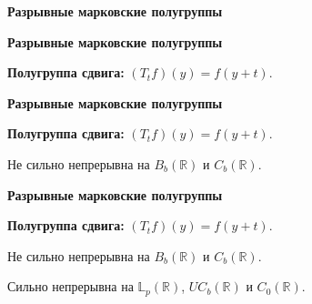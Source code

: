 \documentclass[11pt]{article}
\newcommand{\R}{\mathbb{R}}
\newcommand{\Lp}{\mathbb{L}}
\begin{document}
\newpage

\begin{center}
{\color{notaeYELLOW}\bfseries\fontsize{44}{52}\selectfont Разрывные марковские полугруппы}
\end{center}
\vspace*{\fill}
\begin{center}
\fontsize{36}{43}\selectfont
\end{center}
\vspace*{\fill}

\newpage

\begin{center}
{\color{notaeYELLOW}\bfseries\fontsize{44}{52}\selectfont Разрывные марковские полугруппы}
\end{center}
\vspace*{\fill}
\begin{center}
\fontsize{36}{43}\selectfont
\parbox{\linewidth}{\centering\noindent \textbf{Полугруппа сдвига:} $(T_t f)(y)=f(y+t)$.
\par}\vspace{0.4in}
\end{center}
\vspace*{\fill}

\newpage

\begin{center}
{\color{notaeYELLOW}\bfseries\fontsize{44}{52}\selectfont Разрывные марковские полугруппы}
\end{center}
\vspace*{\fill}
\begin{center}
\fontsize{36}{43}\selectfont
\parbox{\linewidth}{\centering\noindent \textbf{Полугруппа сдвига:} $(T_t f)(y)=f(y+t)$.
\par}\vspace{0.4in}
\parbox{\linewidth}{\centering\noindent Не сильно непрерывна на $B_b(\R)$ и $C_b(\R)$.
\par}\vspace{0.4in}
\end{center}
\vspace*{\fill}

\newpage

\begin{center}
{\color{notaeYELLOW}\bfseries\fontsize{44}{52}\selectfont Разрывные марковские полугруппы}
\end{center}
\vspace*{\fill}
\begin{center}
\fontsize{36}{43}\selectfont
\parbox{\linewidth}{\centering\noindent \textbf{Полугруппа сдвига:} $(T_t f)(y)=f(y+t)$.
\par}\vspace{0.4in}
\parbox{\linewidth}{\centering\noindent Не сильно непрерывна на $B_b(\R)$ и $C_b(\R)$.
\par}\vspace{0.4in}
\parbox{\linewidth}{\centering\noindent Сильно непрерывна на $\Lp_p(\R)$, $UC_b(\R)$ и $C_0(\R)$.
\par}\vspace{0.4in}
\end{center}
\vspace*{\fill}
\end{document}

